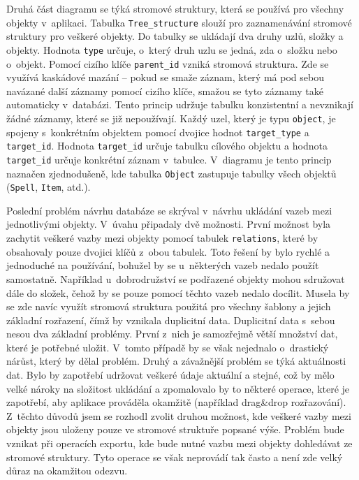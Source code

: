 \documentclass[thesis=B,czech]{resources/FITthesis}[2012/06/26]
\begin{document}
Druhá část diagramu se týká stromové struktury, která se používá pro všechny objekty v~aplikaci. Tabulka \texttt{Tree\_structure} slouží pro zaznamenávání stromové struktury pro veškeré objekty. Do tabulky se ukládají dva druhy uzlů, složky a objekty. Hodnota \texttt{type} určuje, o~který druh uzlu se jedná, zda o~složku nebo o~objekt. Pomocí cizího klíče \texttt{parent\_id} vzniká stromová struktura. Zde se využívá kaskádové mazání -- pokud se smaže záznam, který má pod sebou navázané další záznamy pomocí cizího klíče, smažou se tyto záznamy také automaticky v~databázi. Tento princip udržuje tabulku konzistentní a nevznikají žádné záznamy, které se již nepoužívají. Každý uzel, který je typu \texttt{object}, je spojeny s~konkrétním objektem pomocí dvojice hodnot \texttt{target\_type} a \texttt{target\_id}. Hodnota \texttt{target\_id} určuje tabulku cílového objektu a hodnota \texttt{target\_id} určuje konkrétní záznam v~tabulce. V~diagramu je tento princip naznačen zjednodušeně, kde tabulka \texttt{Object} zastupuje tabulky všech objektů (\texttt{Spell}, \texttt{Item}, atd.). \par

Poslední problém návrhu databáze se skrýval v~návrhu ukládání vazeb mezi jednotlivými objekty. V~úvahu připadaly dvě možnosti. První možnost byla zachytit veškeré vazby mezi objekty pomocí tabulek \texttt{relations}, které by obsahovaly pouze dvojici klíčů z~obou tabulek. Toto řešení by bylo rychlé a jednoduché na používání, bohužel by se u~některých vazeb nedalo použít samostatně. Například u~dobrodružství se podřazené objekty mohou sdružovat dále do složek, čehož by se pouze pomocí těchto vazeb nedalo docílit. Musela by se zde navíc využít stromová struktura použitá pro všechny šablony a jejich základní rozřazení, čímž by vznikala duplicitní data. Duplicitní data s~sebou nesou dva základní problémy. První z~nich je samozřejmě větší množství dat, které je potřebné uložit. V~tomto případě by se však nejednalo o~drastický nárůst, který by dělal problém. Druhý a závažnější problém se týká aktuálnosti dat. Bylo by zapotřebí udržovat veškeré údaje aktuální a stejné, což by mělo velké nároky na složitost ukládání a zpomalovalo by to některé operace, které je zapotřebí, aby aplikace prováděla okamžitě (například drag\&drop rozřazování). Z~těchto důvodů jsem se rozhodl zvolit druhou možnost, kde veškeré vazby mezi objekty jsou uloženy pouze ve stromové struktuře popsané výše. Problém bude vznikat při operacích exportu, kde bude nutné vazbu mezi objekty dohledávat ze stromové struktury. Tyto operace se však neprovádí tak často a není zde velký důraz na okamžitou odezvu. 
\end{document}
